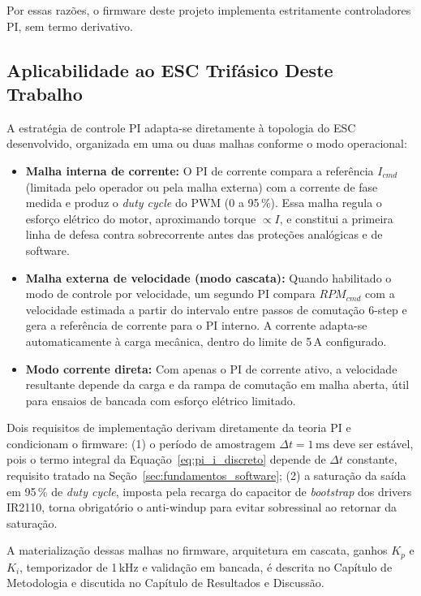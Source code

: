 Por essas razões, o firmware deste projeto implementa estritamente controladores PI, sem termo derivativo.

\subsection{Aplicabilidade ao ESC Trifásico Deste Trabalho}

A estratégia de controle PI adapta-se diretamente à topologia do ESC desenvolvido, organizada em uma ou duas malhas conforme o modo operacional:

\begin{itemize}
    \item \textbf{Malha interna de corrente:} O PI de corrente compara a referência $I_{cmd}$ (limitada pelo operador ou pela malha externa) com a corrente de fase medida e produz o \textit{duty cycle} do PWM (0 a 95\,\%). Essa malha regula o esforço elétrico do motor, aproximando torque $\propto I$, e constitui a primeira linha de defesa contra sobrecorrente antes das proteções analógicas e de software.
    \item \textbf{Malha externa de velocidade (modo cascata):} Quando habilitado o modo de controle por velocidade, um segundo PI compara $RPM_{cmd}$ com a velocidade estimada a partir do intervalo entre passos de comutação 6-step e gera a referência de corrente para o PI interno. A corrente adapta-se automaticamente à carga mecânica, dentro do limite de 5\,A configurado.
    \item \textbf{Modo corrente direta:} Com apenas o PI de corrente ativo, a velocidade resultante depende da carga e da rampa de comutação em malha aberta, útil para ensaios de bancada com esforço elétrico limitado.
\end{itemize}

Dois requisitos de implementação derivam diretamente da teoria PI e condicionam o firmware: (1) o período de amostragem $\Delta t = 1\,\text{ms}$ deve ser estável, pois o termo integral da Equação~\ref{eq:pi_i_discreto} depende de $\Delta t$ constante, requisito tratado na Seção~\ref{sec:fundamentos_software}; (2) a saturação da saída em 95\,\% de \textit{duty cycle}, imposta pela recarga do capacitor de \textit{bootstrap} dos drivers IR2110, torna obrigatório o anti-windup para evitar sobressinal ao retornar da saturação.

A materialização dessas malhas no firmware, arquitetura em cascata, ganhos $K_p$ e $K_i$, temporizador de 1\,kHz e validação em bancada, é descrita no Capítulo de Metodologia e discutida no Capítulo de Resultados e Discussão.

